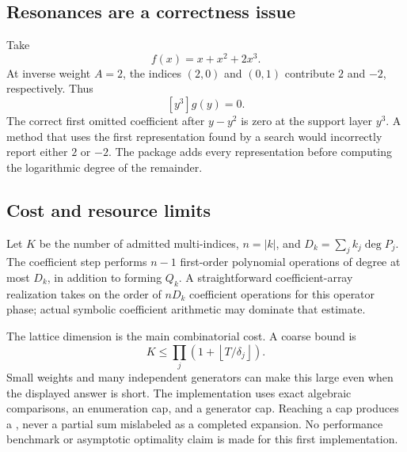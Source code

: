 \documentclass[11pt,a4paper]{article}
\numberwithin{equation}{section}
\theoremstyle{definition}\newtheorem{definition}[theorem]{Definition}
\theoremstyle{remark}\newtheorem{remark}[theorem]{Remark}
\newcommand{\code}[1]{\texttt{\detokenize{#1}}}
\begin{document}
\subsection{Resonances are a correctness issue}
Take
\[
f(x)=x+x^2+2x^3.
\]
At inverse weight $A=2$, the indices $(2,0)$ and $(0,1)$ contribute $2$ and $-2$, respectively. Thus
\[
[y^3]g(y)=0.
\]
The correct first omitted coefficient after $y-y^2$ is zero at the support layer $y^3$. A method that uses the first representation found by a search would incorrectly report either $2$ or $-2$. The package adds every representation before computing the logarithmic degree of the remainder.

\subsection{Cost and resource limits}
Let $K$ be the number of admitted multi-indices, $n=|k|$, and $D_k=\sum_jk_j\deg P_j$. The coefficient step performs $n-1$ first-order polynomial operations of degree at most $D_k$, in addition to forming $Q_k$. A straightforward coefficient-array realization takes on the order of $nD_k$ coefficient operations for this operator phase; actual symbolic coefficient arithmetic may dominate that estimate.

The lattice dimension is the main combinatorial cost. A coarse bound is
\[
K\le\prod_j\left(1+\left\lfloor T/\delta_j\right\rfloor\right).
\]
Small weights and many independent generators can make this large even when the displayed answer is short. The implementation uses exact algebraic comparisons, an enumeration cap, and a generator cap. Reaching a cap produces a \code{Failure}, never a partial sum mislabeled as a completed expansion. No performance benchmark or asymptotic optimality claim is made for this first implementation.
\end{document}
